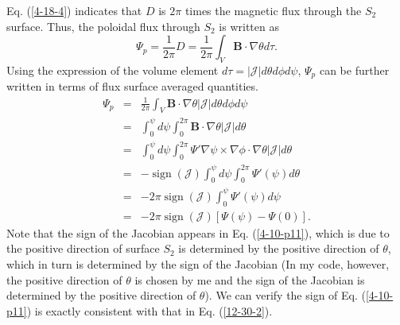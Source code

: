 \documentclass{article}
\newcommand{\tmop}[1]{\ensuremath{\operatorname{#1}}}
\begin{document}
Eq. (\ref{4-18-4}) indicates that $D$ is $2 \pi$ times the magnetic flux
through the $S_2$ surface. Thus, the poloidal flux through $S_2$ is written as
\begin{equation}
  \Psi_p = \frac{1}{2 \pi} D = \frac{1}{2 \pi} \int_V \mathbf{B} \cdot \nabla
  \theta d \tau .
\end{equation}
Using the expression of the volume element $d \tau = |\mathcal{J}| d \theta d
\phi d \psi$, $\Psi_p$ can be further written in terms of flux surface
averaged quantities.
\begin{eqnarray}
  \Psi_p & = & \frac{1}{2 \pi} \int_V \mathbf{B} \cdot \nabla \theta
  |\mathcal{J}| d \theta d \phi d \psi \nonumber\\
  & = & \int_0^{\psi} d \psi \int_0^{2 \pi} \mathbf{B} \cdot \nabla \theta
  |\mathcal{J}| d \theta \nonumber\\
  & = & \int_0^{\psi} d \psi \int_0^{2 \pi} \Psi' \nabla \psi \times \nabla
  \phi \cdot \nabla \theta |\mathcal{J}| d \theta \nonumber\\
  & = & - \tmop{sign} (\mathcal{J}) \int_0^{\psi} d \psi \int_0^{2 \pi} \Psi'
  (\psi) d \theta \nonumber\\
  & = & - 2 \pi \tmop{sign} (\mathcal{J}) \int_0^{\psi} \Psi' (\psi) d \psi
  \nonumber\\
  & = & - 2 \pi \tmop{sign} (\mathcal{J}) [\Psi (\psi) - \Psi (0)] . 
  \label{4-10-p11}
\end{eqnarray}
Note that the sign of the Jacobian appears in Eq. (\ref{4-10-p11}), which is
due to the positive direction of surface $S_2$ is determined by the positive
direction of $\theta$, which in turn is determined by the sign of the Jacobian
(In my code, however, the positive direction of $\theta$ is chosen by me and
the sign of the Jacobian is determined by the positive direction of $\theta$).
We can verify the sign of Eq. (\ref{4-10-p11}) is exactly consistent with that
in Eq. (\ref{12-30-2}).
\end{document}
